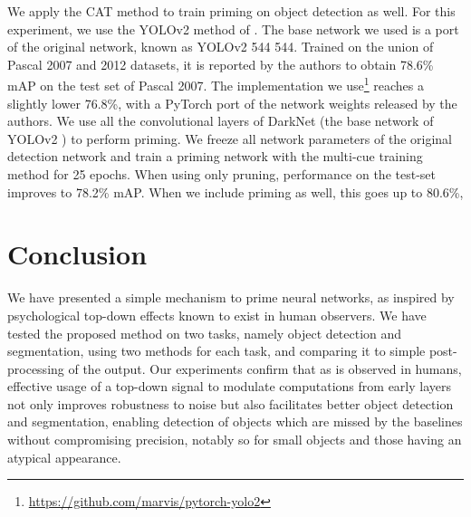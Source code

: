 \documentclass[10pt,letterpaper,twocolumn]{article}
\begin{document}
We apply the CAT method to train priming on object detection as well.
For this experiment, we use the YOLOv2 method of \cite{redmon2016yolo9000}.
The base network we used is a port of the original network, known
as YOLOv2 544 \texttimes{} 544. Trained on the union of Pascal 2007
and 2012 datasets, it is reported by the authors to obtain 78.6\%
mAP on the test set of Pascal 2007. The implementation we use\footnote{\url{https://github.com/marvis/pytorch-yolo2}}
reaches a slightly lower 76.8\%, with a PyTorch port of the network
weights released by the authors. We use all the convolutional layers
of DarkNet (the base network of YOLOv2 ) to perform priming. We freeze
all network parameters of the original detection network and train
a priming network with the multi-cue training method for 25 epochs.
When using only pruning, performance on the test-set improves to 78.2\%
mAP. When we include priming as well, this goes up to 80.6\%,

\section{Conclusion}

We have presented a simple mechanism to prime neural networks, as
inspired by psychological top-down effects known to exist in human
observers. We have tested the proposed method on two tasks, namely
object detection and segmentation, using two methods for each task,
and comparing it to simple post-processing of the output. Our experiments
confirm that as is observed in humans, effective usage of a top-down
signal to modulate computations from early layers not only improves
robustness to noise but also facilitates better object detection and
segmentation, enabling detection of objects which are missed by the
baselines without compromising precision, notably so for small objects
and those having an atypical appearance. 



\end{document}
